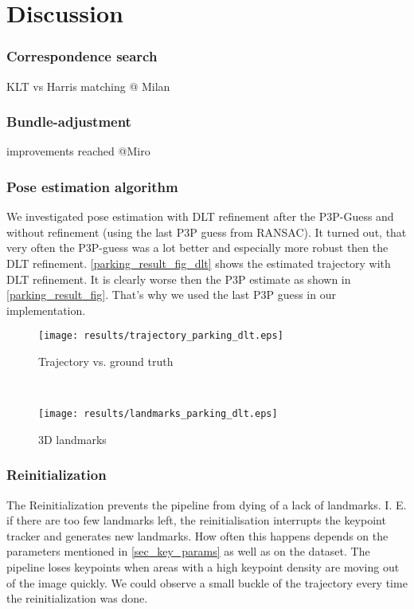 \section{Discussion}

\subsubsection{Correspondence search}

KLT vs Harris matching
\textcolor[rgb]{1,0,0}{@ Milan}

\subsubsection{Bundle-adjustment}
improvements reached
\textcolor[rgb]{1,0,0}{@Miro}

\subsubsection{Pose estimation algorithm}
We investigated pose estimation with DLT refinement after the P3P-Guess and without refinement (using the last P3P guess from RANSAC). It turned out, that very often the P3P-guess was a lot better and especially more robust then the DLT refinement. \cref{parking_result_fig_dlt} shows the estimated trajectory with DLT refinement. It is clearly worse then the P3P estimate as shown in \cref{parking_result_fig}. That's why we used the last P3P guess in our implementation.
\begin{figure*}[ht!]
    \centering
    \begin{subfigure}[t]{0.5\textwidth}
        \centering
        \texttt{[image: results/trajectory\_parking\_dlt.eps]} 
        \caption{Trajectory vs. ground truth}
    \end{subfigure}%
    ~ 
    \begin{subfigure}[t]{0.5\textwidth}
        \centering
        \texttt{[image: results/landmarks\_parking\_dlt.eps]}
        \caption{3D landmarks}
    \end{subfigure}
    \caption{Parking dataset results with DLT refinement}
		\label{parking_result_fig_dlt}
\end{figure*}

\subsubsection{Reinitialization}
The Reinitialization prevents the pipeline from dying of a lack of landmarks. I. E. if there are too few landmarks left, the reinitialisation interrupts the keypoint tracker and generates new landmarks. How often this happens depends on the parameters mentioned in \cref{sec_key_params} as well as on the dataset. The pipeline loses keypoints when areas with a high keypoint density are moving out of the image quickly. We could observe a small buckle of the trajectory every time the reinitialization was done.


